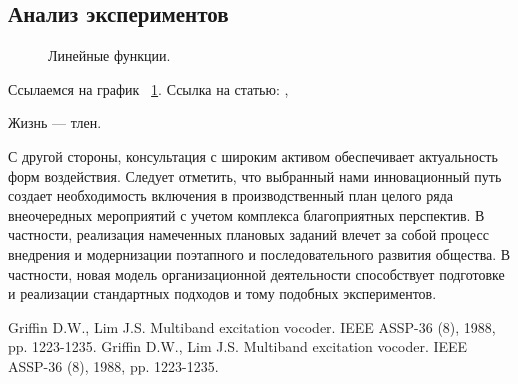 \documentclass[a4paper,article,14pt]{extarticle}
\begin{document}
\subsection{Анализ экспериментов}
\begin{figure}[ht]
\begin{center}

\caption{
\label{graph-fig}
     Линейные функции.}
\end {center}
\end {figure}
Ссылаемся на график ~\ref{graph-fig}.
Ссылка на статью: \cite{voc}, \cite{vo2}

Жизнь --- тлен.
\pagebreak


С другой стороны, консультация с широким активом обеспечивает актуальность форм воздействия. Следует отметить, что выбранный нами инновационный путь создает необходимость включения в производственный план целого ряда внеочередных мероприятий с учетом комплекса благоприятных перспектив. В частности, реализация намеченных плановых заданий влечет за собой процесс внедрения и модернизации поэтапного и последовательного развития общества. В частности, новая модель организационной деятельности способствует подготовке и реализации стандартных подходов и тому подобных экспериментов.

\begin{thebibliography}{1}
 Griffin D.W., Lim J.S. \flqq Multiband excitation vocoder\frqq. IEEE ASSP-36 (8), 1988, pp. 1223-1235.
 Griffin D.W., Lim J.S. \flqq Multiband excitation vocoder\frqq. IEEE ASSP-36 (8), 1988, pp. 1223-1235.
\end{thebibliography}
\end{document}
